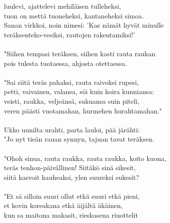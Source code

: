 luulevi, ajattelevi mehiläisen tulleheksi,                             \\
tuon on mettä tuoneheksi, kantaneheksi simoa.                          \\
Sanan virkkoi, noin nimesi: 'Kas nämät hyvät minulle                   \\
teräksenteko-vesiksi, rautojen rakentamiksi!'                          \\
                                                                       \\
"Siihen tempasi teräksen, siihen kasti rauta raukan                    \\
pois tulesta tuotaessa, ahjosta otettaessa.                            \\
                                                                       \\
"Sai siitä teräs pahaksi, rauta raivoksi rupesi,                       \\
petti, vaivainen, valansa, söi kuin koira kunniansa:                   \\
veisti, raukka, veljeänsä, sukuansa suin piteli,                       \\
veren päästi vuotamahan, hurmehen hurahtamahan."                       \\
                                                                       \\
Ukko uunilta urahti, parta lauloi, pää järähti:                        \\
"Jo nyt tieän rauan synnyn, tajuan tavat teräksen.                     \\
                                                                       \\
"Ohoh sinua, rauta raukka, rauta raukka, koito kuona,                  \\
teräs tenhon-päivällinen! Siitäkö sinä sikesit,                        \\
siitä kasvoit kauheaksi, ylen suureksi sukesit?                        \\
                                                                       \\
"Et sä silloin suuri ollut etkä suuri etkä pieni,                      \\
et kovin koreakana etkä äijältä äkäinen,                               \\
kun sa maitona makasit, rieskasena riuottelit                          \\
